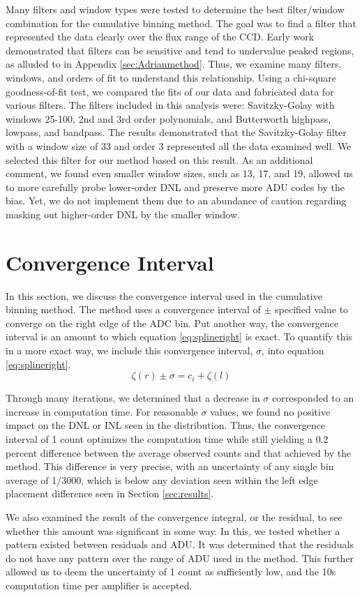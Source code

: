 \documentclass[linenumbers]{aastex7}
\begin{document}
Many filters and window types were tested to determine the best filter/window combination for the cumulative binning method. 
The goal was to find a filter that represented the data clearly over the flux range of the CCD. 
Early work demonstrated that filters can be sensitive and tend to undervalue peaked regions, as alluded to in Appendix \ref{sec:Adrianmethod}. 
Thus, we examine many filters, windows, and orders of fit to understand this relationship. 
Using a chi-square goodness-of-fit test, we compared the fits of our data and fabricated data for various filters. 
The filters included in this analysis were: Savitzky-Golay with windows 25-100, 2nd and 3rd order polynomials, and Butterworth highpass, lowpass, and bandpass. 
The results demonstrated that the Savitzky-Golay filter with a window size of 33 and order 3 represented all the data examined well.
We selected this filter for our method based on this result. 
As an additional comment, we found even smaller window sizes, such as 13, 17, and 19, allowed us to more carefully probe lower-order DNL and preserve more ADU codes by the bias. 
Yet, we do not implement them due to an abundance of caution regarding masking out higher-order DNL by the smaller window. 

\section{Convergence Interval}
\label{sec:Convergence Interval}


In this section, we discuss the convergence interval used in the cumulative binning method. 
The method uses a convergence interval of $\pm$ specified value to converge on the right edge of the ADC bin.
Put another way, the convergence interval is an amount to which equation \ref{eq:splineright} is exact.
To quantify this in a more exact way, we include this convergence interval, $\sigma$, into equation \ref{eq:splineright}. 
\begin{equation}
\zeta(r) \pm \sigma = c_i + \zeta(l)  
\label{eq:splinerighterr}
\end{equation}

Through many iterations, we determined that a decrease in $\sigma$ corresponded to an increase in computation time.  
For reasonable $\sigma$ values, we found no positive impact on the DNL or INL seen in the distribution. 
Thus, the convergence interval of 1 count optimizes the computation time while still yielding a 0.2 percent difference between the average observed counts and that achieved by the method. 
This difference is very precise, with an uncertainty of any single bin average of 1/3000, which is below any deviation seen within the left edge placement difference seen in Section \ref{sec:results}.  

We also examined the result of the convergence integral, or the residual, to see whether this amount was significant in some way. 
In this, we tested whether a pattern existed between residuals and ADU.
It was determined that the residuals do not have any pattern over the range of ADU used in the method.
This further allowed us to deem the uncertainty of 1 count as sufficiently low, and the 10s computation time per amplifier is accepted. 
\end{document}
